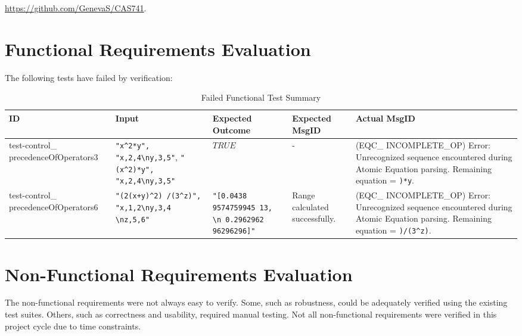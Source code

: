 \documentclass[12pt, titlepage]{article}
\begin{document}
\begin{center}
	\href{https://github.com/GenevaS/CAS741}{https://github.com/GenevaS/CAS741}.
\end{center} 

\section{Functional Requirements Evaluation}

The following tests have failed by verification:

	\begin{center}
		\begin{longtable}{ | p{3cm} | p{3cm} | p{2cm} | p{2cm} | p{3cm} |}
			\caption{Failed Functional Test Summary} \\ \hline 
			\label{TblInputVar} 
			ID & Input & Expected Outcome & Expected MsgID & Actual MsgID \\ 
			\hline
			test-control\_ precedenceOfOperators3 & 
			\texttt{"x\textasciicircum2*y", 
				"x,2,4\textbackslash ny,3,5"}, 
				\texttt{"(x\textasciicircum2)*y", 
				"x,2,4\textbackslash ny,3,5"} & $TRUE$ & - & (EQC\_ 
				INCOMPLETE\_OP) 
			Error: Unrecognized sequence encountered during Atomic Equation 
			parsing. Remaining equation = \texttt{)*y}. \\ \hline
			
			test-control\_ precedenceOfOperators6 & 
			\texttt{"(2(x+y)\textasciicircum2) /(3\textasciicircum z)", 
				"x,1,2\textbackslash ny,3,4 \textbackslash nz,5,6"} & 
			\texttt{"[0.0438 9574759945 13, \textbackslash n 0.2962962 
			96296296]"} 
			& 
			Range calculated successfully. & (EQC\_ INCOMPLETE\_OP) Error: 
			Unrecognized sequence 
			encountered during Atomic Equation parsing. Remaining equation = 
			\texttt{)/(3\textasciicircum z)}. \\ \hline
		\end{longtable}
	\end{center}


\section{Non-Functional Requirements Evaluation}
The non-functional requirements were not always easy to verify. Some, such as 
robustness, could be adequately verified using the existing test suites. 
Others, such as correctness and usability, required manual testing. Not all 
non-functional requirements were verified in this project cycle due to time 
constraints.
\end{document}
